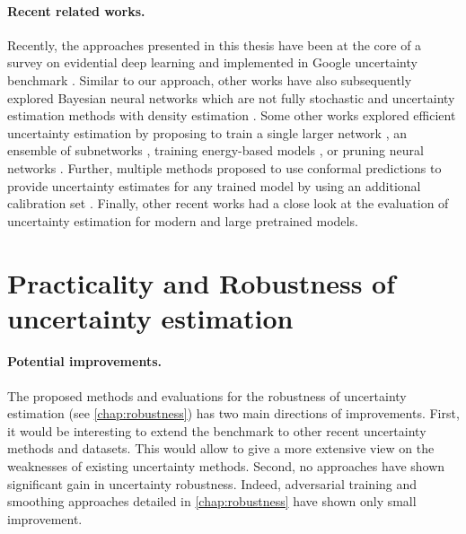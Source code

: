 \paragraph{Recent related works.} Recently, the approaches presented in this thesis have been  at the core of a survey on evidential deep learning \cite{survey_evidential_uncertainty} and implemented in Google uncertainty benchmark \cite{nado2021uncertainty}. Similar to our approach, other works have also subsequently explored Bayesian neural networks which are not fully stochastic \cite{bnnfullystochastic2022sharma} and uncertainty estimation methods with density estimation \cite{du2022vos, postels2020hiddenuncertainty, uncertainty-generative-classifier}. Some other works explored efficient uncertainty estimation by proposing to train a single larger network \cite{abe2022deep}, an ensemble of subnetworks \cite{mimo-independent-subnetworks}, training energy-based models \cite{ood_ebm}, or pruning neural networks \cite{ayle2022robustness-sparse}. Further, multiple methods proposed to use conformal predictions to provide uncertainty estimates for any trained model by using an additional calibration set \cite{conformal-survey, Park2020PAC}. Finally, other recent works \cite{minderer2021revisiting, tran2022plex} had a close look at the evaluation of uncertainty estimation for modern and large pretrained models.


\section{Practicality and Robustness of uncertainty estimation} 

\paragraph{Potential improvements.} The proposed methods and evaluations for the robustness of uncertainty estimation (see \cref{chap:robustness}) has two main directions of improvements. First, it would be interesting to extend the benchmark to other recent uncertainty methods and datasets. This would allow to give a more extensive view on the weaknesses of existing uncertainty methods. Second, no approaches have shown significant gain in uncertainty robustness. Indeed, adversarial training and smoothing approaches detailed in \cref{chap:robustness} have shown only small improvement.

